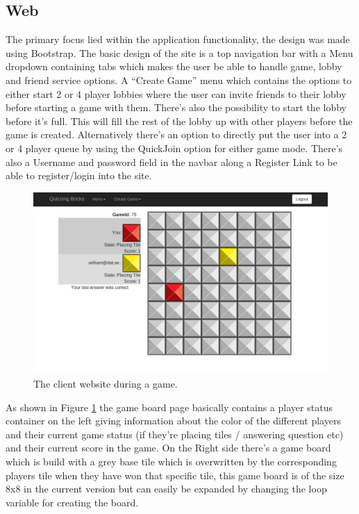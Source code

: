 \subsection{Web}
The primary focus lied within the application functionality, the design was made using Bootstrap\cite{ref_bootstrap}. 
The basic design of the site is a top navigation bar with a Menu dropdown containing tabs which makes the user be able to handle game, lobby and friend service options. A  ``Create Game'' menu which contains the options to either start 2 or 4 player lobbies where the user can invite friends to their lobby before starting a game with them. There's also the possibility to start the lobby before it's full. This will fill the rest of the lobby up with other players before the game is created. Alternatively there's an option to directly put the user into a 2 or 4 player queue by using the QuickJoin option for either game mode. There's also a Username and password field in the navbar along a Register Link to be able to register/login into the site.

\begin{figure}[H]
	\centering
	\includegraphics[width=\textwidth,height=\textheight,keepaspectratio=true]{img/game_board_page.png}
	\caption{The client website during a game.}
	\label{fig:web}
\end{figure}

As shown in Figure \ref{fig:web} the game board page basically contains a player status container on the left giving information about the color of the different players and their current game status (if they're placing tiles / answering question etc) and their current score in the game. On the Right side there's  a game board which is build with a grey base tile which is overwritten by the corresponding players tile when they have won that specific tile, this game board is of the size 8x8 in the current version but can easily be expanded by changing the loop variable for creating the board.

